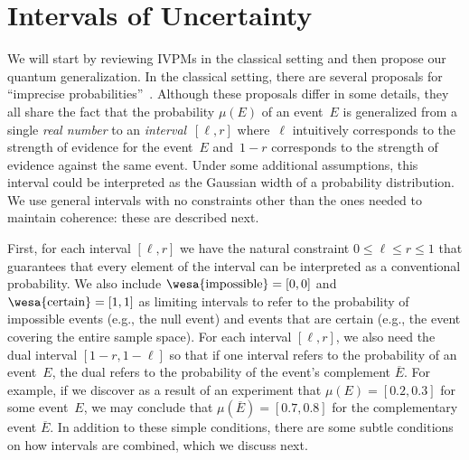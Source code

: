 \documentclass[english,reprint, aps, prl,superscriptaddress, showpacs,
showkeys, longbibliography, amsmath, amssymb, floatfix]{revtex4-1}
\theoremstyle{plain}
\theoremstyle{definition}
\newcommand{\imposs}{{\text{\wesa{impossible}}}}
\newcommand{\necess}{{\text{\wesa{certain}}}}
\begin{document}
\section{Intervals of Uncertainty}
\label{sec:Interval-Uncertainty}

We will start by reviewing IVPMs in the classical setting and then
propose our quantum generalization. In the classical setting, there
are several proposals for ``imprecise
probabilities''~\citep{Dempster1967,Shafer1976,GilboaSchmeidler1994,Marinacci1999,Weichselberger2000,JamisonLodwick2004,HuberRonchetti2009,Grabisch2016}.
Although these proposals differ in some details, they all share the
fact that the probability $\mu(E)$ of an event~$E$ is generalized from
a single \emph{real number} to an \emph{interval}~$[\ell,r]$
where~$\ell$ intuitively corresponds to the strength of evidence for
the event~$E$ and~$1-r$ corresponds to the strength of evidence
against the same event. Under some additional assumptions, this
interval could be interpreted as the Gaussian width of a probability
distribution. We use general intervals with no constraints other than
the ones needed to maintain coherence: these are described next. 

First, for each interval $[\ell,r]$ we have the natural constraint
$0 \leq \ell \leq r \leq 1$ that guarantees that every element of the
interval can be interpreted as a conventional probability. We also
include $\imposs=[0,0]$ and $\necess=[1,1]$ as limiting intervals to
refer to the probability of impossible events (e.g., the null event)
and events that are certain (e.g., the event covering the entire
sample space).  For each interval $[\ell,r]$, we also need the dual
interval $[1-r,1-\ell]$ so that if one interval refers to the
probability of an event~$E$, the dual refers to the probability of the
event's complement $\overline{E}$.  For example, if we discover as a
result of an experiment that $\mu(E) = [0.2,0.3]$ for some event~$E$,
we may conclude that $\mu(\overline{E}) = [0.7,0.8]$ for the
complementary event $\overline{E}$. In addition to these simple
conditions, there are some subtle conditions on how intervals are
combined, which we discuss next.
\end{document}

